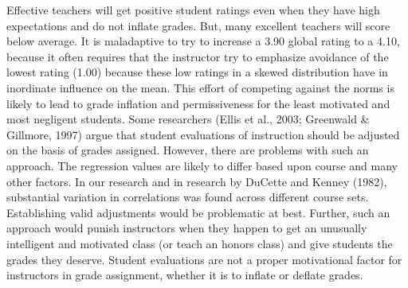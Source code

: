 \documentclass[,man]{apa6}
\theoremstyle{definition}
\theoremstyle{definition}
\theoremstyle{definition}
\theoremstyle{remark}
\begin{document}
Effective teachers will get positive student ratings even when they have
high expectations and do not inflate grades. But, many excellent
teachers will score below average. It is maladaptive to try to increase
a 3.90 global rating to a 4.10, because it often requires that the
instructor try to emphasize avoidance of the lowest rating (1.00)
because these low ratings in a skewed distribution have in inordinate
influence on the mean. This effort of competing against the norms is
likely to lead to grade inflation and permissiveness for the least
motivated and most negligent students. Some researchers (Ellis et al.,
2003; Greenwald \& Gillmore, 1997) argue that student evaluations of
instruction should be adjusted on the basis of grades assigned. However,
there are problems with such an approach. The regression values are
likely to differ based upon course and many other factors. In our
research and in research by DuCette and Kenney (1982), substantial
variation in correlations was found across different course sets.
Establishing valid adjustments would be problematic at best. Further,
such an approach would punish instructors when they happen to get an
unusually intelligent and motivated class (or teach an honors class) and
give students the grades they deserve. Student evaluations are not a
proper motivational factor for instructors in grade assignment, whether
it is to inflate or deflate grades.
\end{document}
